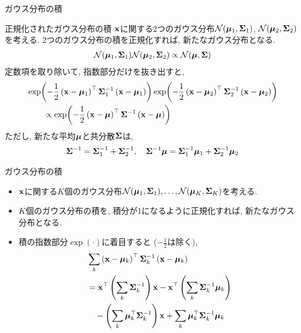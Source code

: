 \documentclass[dvipdfmx,notheorems,t]{beamer}
\begin{document}
\begin{frame}{ガウス分布の積}
\begin{block}{正規化されたガウス分布の積}
  $\vb{x}$に関する2つのガウス分布$\mathcal{N}(\vb*{\mu}_1, \vb{\Sigma}_1)$,
  $\mathcal{N}(\vb*{\mu}_2, \vb{\Sigma}_2)$を考える.
  2つのガウス分布の積を正規化すれば, 新たなガウス分布となる.
  \begin{align*}
    \mathcal{N}(\vb*{\mu}_1, \vb{\Sigma}_1) \mathcal{N}(\vb*{\mu}_2, \vb{\Sigma}_2)
    \propto \mathcal{N}(\vb*{\mu}, \vb{\Sigma})
  \end{align*}
  定数項を取り除いて, 指数部分だけを抜き出すと,
  {\small \begin{align*}
    & \exp(-\frac{1}{2} \left( \vb{x} - \vb*{\mu}_1 \right)^\top \vb{\Sigma}_1^{-1}
      \left( \vb{x} - \vb*{\mu}_1 \right))
    \exp(-\frac{1}{2} \left( \vb{x} - \vb*{\mu}_2 \right)^\top \vb{\Sigma}_2^{-1}
      \left( \vb{x} - \vb*{\mu}_2 \right)) \\
    & \qquad \propto \exp(-\frac{1}{2} \left( \vb{x} - \vb*{\mu} \right)^\top \vb{\Sigma}^{-1}
      \left( \vb{x} - \vb*{\mu} \right))
  \end{align*}}
  ただし, 新たな平均$\vb*{\mu}$と共分散$\vb{\Sigma}$は,
  \begin{gather*}
    \vb{\Sigma}^{-1} = \vb{\Sigma}_1^{-1} + \vb{\Sigma}_2^{-1}, \quad
    \vb{\Sigma}^{-1} \vb*{\mu} = \vb{\Sigma}_1^{-1} \vb*{\mu}_1 + \vb{\Sigma}_2^{-1} \vb*{\mu}_2
  \end{gather*}
\end{block}
\end{frame}

\begin{frame}{ガウス分布の積}
\begin{itemize}
  \item $\vb{x}$に関する$K$個のガウス分布$\mathcal{N}(\vb*{\mu}_1, \vb{\Sigma}_1), \ldots,
    \mathcal{N}(\vb*{\mu}_K, \vb{\Sigma}_K)$を考える.
  \item $K$個のガウス分布の積を, 積分が1になるように正規化すれば, 新たなガウス分布となる.
  \item 積の指数部分$\exp(\cdot)$に着目すると ($-\frac{1}{2}$は除く),
  \begin{align*}
    & \sum_k \left( \vb{x} - \vb*{\mu}_k \right)^\top \vb{\Sigma}_k^{-1} \left( \vb{x} - \vb*{\mu}_k \right) \\
    &= \vb{x}^\top \left( \sum_k \vb{\Sigma}_k^{-1} \right) \vb{x}
      - \vb{x}^\top \left( \sum_k \vb{\Sigma}_k^{-1} \vb*{\mu}_k \right) \\
    & \quad - \left( \sum_k \vb*{\mu}_k^\top \vb{\Sigma}_k^{-1} \right) \vb{x}
      + \sum_k \vb*{\mu}_k^\top \vb{\Sigma}_k^{-1} \vb*{\mu}_k
  \end{align*}
\end{itemize}
\end{frame}
\end{document}
